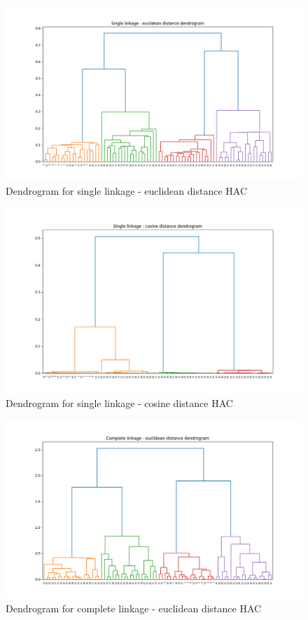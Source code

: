 \documentclass[12pt,a4paper, margin=1in]{article}
\begin{document}
\begin{figure}[H]
    \centering
    \includegraphics[scale=0.5]{single_euclidean_dendrogram.png}
    \caption{Dendrogram for single linkage - euclidean distance HAC}
\end{figure}

\begin{figure}[H]
    \centering
    \includegraphics[scale=0.5]{single_cosine_dendrogram.png}
    \caption{Dendrogram for single linkage - cosine distance HAC}
\end{figure}

\begin{figure}[H]
    \centering
    \includegraphics[scale=0.5]{complete_euclidean_dendrogram.png}
    \caption{Dendrogram for complete linkage - euclidean distance HAC}
\end{figure}
\end{document}
